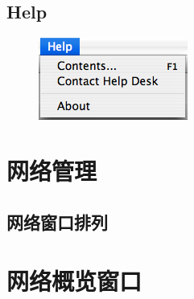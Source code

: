 	\subsection{Help}
	\begin{figure}[!h]
	\centerline{\includegraphics[scale=0.6]{images/menu_help_25.png}}
	\end{figure}

\section{网络管理}
	\subsection{网络窗口排列}

\section{网络概览窗口}
	




